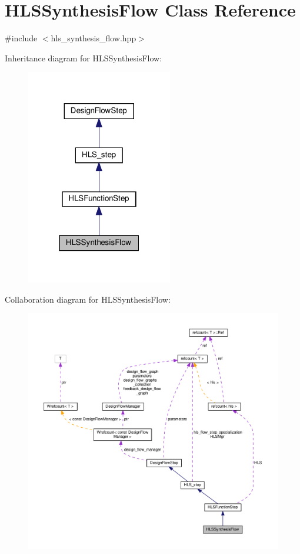 \hypertarget{classHLSSynthesisFlow}{}\section{H\+L\+S\+Synthesis\+Flow Class Reference}
\label{classHLSSynthesisFlow}


{\ttfamily \#include $<$hls\+\_\+synthesis\+\_\+flow.\+hpp$>$}



Inheritance diagram for H\+L\+S\+Synthesis\+Flow\+:
\nopagebreak
\begin{figure}[H]
\begin{center}
\leavevmode
\includegraphics[width=181pt]{d3/dfc/classHLSSynthesisFlow__inherit__graph}
\end{center}
\end{figure}


Collaboration diagram for H\+L\+S\+Synthesis\+Flow\+:
\nopagebreak
\begin{figure}[H]
\begin{center}
\leavevmode
\includegraphics[width=350pt]{d3/df5/classHLSSynthesisFlow__coll__graph}
\end{center}
\end{figure}
